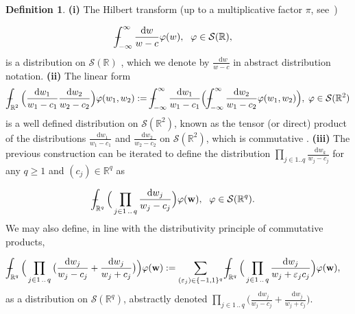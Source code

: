 \documentclass[11pt,A4,twoside]{article}
\numberwithin{equation}{section}
\newcommand{\intc}{\dashint_{-\infty}^\infty}
\newcommand{\intcc}{\dashint}
\renewcommand*\d{\mathop{}\!\mathrm{d}}
\newcommand{\w}{\mathbf{w}}
\newcommand{\R}{\mathbbm{R}}
\renewcommand{\S}{\mathcal{S}}
\def\Phint#1{\mathchoice
  {\XXint\displaystyle\textstyle{#1}}%
  {\XXint\textstyle\scriptstyle{#1}}%
  {\XXint\scriptstyle\scriptscriptstyle{#1}}%
  {\XXint\scriptscriptstyle\scriptscriptstyle{#1}}%
  \!\int}
\def\XXint#1#2#3{{\setbox0=\hbox{$#1{#2#3}{\int}$}
    \vcenter{\hbox{$#2#3$}}\kern-.5\wd0}}
\def\dashint{\Phint-}
\newcommand{\beqa}{\begin{eqnarray}}
\newcommand{\eeqa}{\end{eqnarray}}
\def\bal{\begin{aligned}}
\def\eal{\end{aligned}}
\def\bll#1{
\beqa\label{#1}\bal
}\def\lel{\eal\eeqa}
\newcommand{\beql}[1]{\bll{#1}}
\newcommand{\eeql}{\lel}
\theoremstyle{definition}
\newtheorem{definition}{Definition}[section]
\theoremstyle{remark}
\def\sp{,\;}
\def\R{\mathbb{R}}
\def\otimes{}
\def\bigotimes{\prod}
\begin{document}
\begin{definition}\label{d:ppv}
{\rm \textbf{(i)}} The Hilbert transform (up to a multiplicative factor $\pi$, see\ \citet[Section 3.1 page 83]{king_2009}) %
\beql{e:ht}& \intc \frac{\d w}{w-c} \varphi(w)\sp\ \varphi\in\S(\R),
\eeql
is a distribution on $\S(\R)$ \citep[Proposition 6 page 136]{reed1980functional}, 
which we denote by $ \frac{\d w}{w  - c } $ in abstract distribution notation.
{\rm\hfill\break \textbf{(ii)}} The linear form
\begin{align*}
 \intcc_{\R^2} \Big(\frac{\d w_1 }{ w_1-c_1 } \otimes  \frac{  \d w_2}{ w_2-c_2 }\Big)   \varphi(w_1,w_2):= \intc \frac{\d w_1}{w_1-c_1}     \Big(\intc \frac{\d w_2}{w_1-c_2}  \varphi(w_1,w_2) \Big)\sp \varphi   \in\S(\R^2)
 \end{align*}  
is a well defined distribution on  $\S(\R^2)$, known as the tensor (or direct) product of the distributions %
$\frac{\d w_1}{w_1-c_1}$ and $\frac{\d w_2}{w_2-c_2}$
on $\S(\R^2)$, which is commutative \citep[page 185]{kanwal}.
{\rm\hfill\break \textbf{(iii)}} The previous construction can be iterated to define the distribution $\prod_{j\in1..q} \frac{\d w_k}{w_j - c_j}$ for any $q\ge 1$ and $(c_j)\in\R^q$ as
\beql{e:ppv}
& 
\intcc_{\R^q} \Big(\bigotimes_{j\in 1\,..\,q} \frac{\d w_j}{w_j-c_j} \Big)
\varphi(\w)
\sp\ \varphi\in\S(\R^q).
\eeql 
We may also define, in line with the distributivity principle of commutative products, 
\beql{e:ppvprod}
& 
 \intcc_{\R^q} \Big(\bigotimes_{j\in 1\,..\,q}\big( \frac{\d w_j}{w_j-c_j} +\frac{\d w_j}{w_j+c_j} \big) \Big)
\varphi(\w) := %
\sum_{(\varepsilon_j )\in\{-1, 1\}^{q}}
\intcc_{\R^q} \Big(\bigotimes_{j\in 1\,..\,q} \frac{\d w_j}{w_j+\varepsilon_j c_j} \Big)
\varphi(\w),
\eeql 
as a distribution on  $\S(\R^q)$, abstractly denoted %
$\bigotimes_{j\in 1\,..\,q}\Big(   \frac {\d w_j}{w_j-c_j} +\frac {\d w_j}{w_j+c_j}  \Big)$.
\end{definition}
\end{document}
